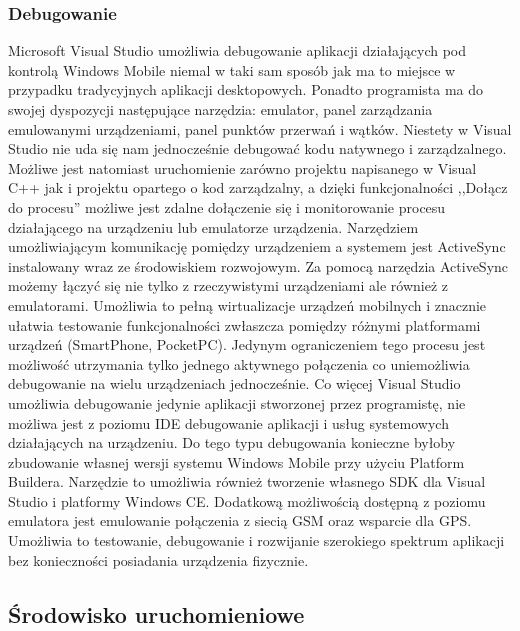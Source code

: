 \subsubsection{Debugowanie}
Microsoft Visual Studio umożliwia debugowanie aplikacji działających pod
kontrolą Windows Mobile niemal w taki sam sposób jak ma to miejsce w przypadku
tradycyjnych aplikacji desktopowych. Ponadto programista ma do swojej dyspozycji
następujące narzędzia: emulator, panel zarządzania emulowanymi urządzeniami,
panel punktów przerwań i wątków. Niestety w Visual Studio nie uda się nam
jednocześnie debugować kodu natywnego i zarządzalnego. Możliwe jest natomiast
uruchomienie zarówno projektu napisanego w Visual C++ jak i projektu opartego o
kod zarządzalny, a dzięki funkcjonalności ,,Dołącz do procesu'' możliwe jest
zdalne dołączenie się i monitorowanie procesu działającego na urządzeniu lub
emulatorze urządzenia. Narzędziem umożliwiającym komunikację pomiędzy
urządzeniem a systemem jest ActiveSync instalowany wraz ze środowiskiem
rozwojowym. Za pomocą narzędzia ActiveSync możemy łączyć się nie tylko z
rzeczywistymi urządzeniami ale również z emulatorami. Umożliwia to pełną
wirtualizacje urządzeń mobilnych i znacznie ułatwia testowanie funkcjonalności
zwłaszcza pomiędzy różnymi platformami urządzeń (SmartPhone, PocketPC). Jedynym
ograniczeniem tego procesu jest możliwość utrzymania tylko jednego aktywnego
połączenia co uniemożliwia debugowanie na wielu urządzeniach jednocześnie. Co
więcej Visual Studio umożliwia debugowanie jedynie aplikacji stworzonej przez
programistę, nie możliwa jest z poziomu IDE debugowanie aplikacji i usług
systemowych działających na urządzeniu. Do tego typu debugowania konieczne
byłoby zbudowanie własnej wersji systemu Windows Mobile przy użyciu Platform
Buildera. Narzędzie to umożliwia również tworzenie własnego SDK dla Visual
Studio i platformy Windows CE. Dodatkową możliwością dostępną z poziomu
emulatora jest emulowanie połączenia z siecią GSM oraz wsparcie dla GPS.
Umożliwia to testowanie, debugowanie i rozwijanie szerokiego spektrum aplikacji
bez konieczności posiadania urządzenia fizycznie.

\subsection{Środowisko uruchomieniowe}